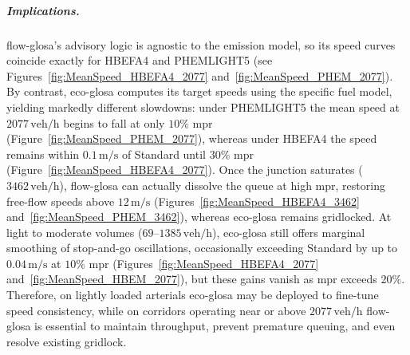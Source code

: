 \subparagraph*{Implications.}
\ac{flow-glosa}’s advisory logic is agnostic to the emission model, so its speed curves coincide exactly for HBEFA4 and PHEMLIGHT5 (see Figures~\ref{fig:MeanSpeed_HBEFA4_2077} and~\ref{fig:MeanSpeed_PHEM_2077}). By contrast, \ac{eco-glosa} computes its target speeds using the specific fuel model, yielding markedly different slowdowns: under PHEMLIGHT5 the mean speed at $2077\,\mathrm{veh/h}$ begins to fall at only $10\%$ \ac{mpr} (Figure~\ref{fig:MeanSpeed_PHEM_2077}), whereas under HBEFA4 the speed remains within $0.1\,\mathrm{m/s}$ of Standard until $30\%$ \ac{mpr} (Figure~\ref{fig:MeanSpeed_HBEFA4_2077}). Once the junction saturates ($3462\,\mathrm{veh/h}$), \ac{flow-glosa} can actually dissolve the queue at high \ac{mpr}, restoring free-flow speeds above $12\,\mathrm{m/s}$ (Figures~\ref{fig:MeanSpeed_HBEFA4_3462} and~\ref{fig:MeanSpeed_PHEM_3462}), whereas \ac{eco-glosa} remains gridlocked. At light to moderate volumes ($69$–$1385\,\mathrm{veh/h}$), \ac{eco-glosa} still offers marginal smoothing of stop-and-go oscillations, occasionally exceeding Standard by up to $0.04\,\mathrm{m/s}$ at $10\%$ \ac{mpr} (Figures~\ref{fig:MeanSpeed_HBEFA4_2077} and~\ref{fig:MeanSpeed_HBEM_2077}), but these gains vanish as \ac{mpr} exceeds $20\%$. Therefore, on lightly loaded arterials \ac{eco-glosa} may be deployed to fine-tune speed consistency, while on corridors operating near or above $2077\,\mathrm{veh/h}$ \ac{flow-glosa} is essential to maintain throughput, prevent premature queuing, and even resolve existing gridlock.

